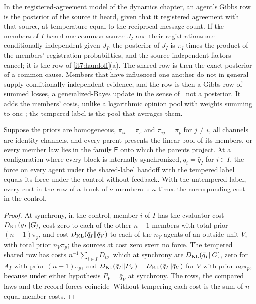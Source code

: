 \documentclass[11pt,letterpaper]{report}
\begin{document}
In the registered-agreement model of the dynamics chapter, an agent's Gibbs row is the posterior of the source it heard, given that it registered agreement with that source, at temperature equal to the reciprocal message count. If the members of $I$ heard one common source $J_I$ and their registrations are conditionally independent given $J_I$, the posterior of $J_I$ is $\pi_I$ times the product of the members' registration probabilities, and the source-independent factors cancel; it is the row of \cref{it7:handoff}(a). The shared row is then the exact posterior of a common cause. Members that have influenced one another do not in general supply conditionally independent evidence, and the row is then a Gibbs row of summed losses, a generalized-Bayes update in the sense of \citet{BissiriHolmesWalker2016}, not a posterior. It adds the members' costs, unlike a logarithmic opinion pool with weights summing to one \citep{GenestZidek1986}; the tempered label is the pool that averages them.

Suppose the priors are homogeneous, $\pi_{ii}=\pi_s$ and $\pi_{ij}=\pi_p$ for $j\ne i$, all channels are identity channels, and every parent presents the linear pool of its members, or every member law lies in the family $\mathsf E$ onto which the parents project. At a configuration where every block is internally synchronized, $q_i=\bar q_I$ for $i\in I$, the force on every agent under the shared-label handoff with the tempered label equals its force under the control without feedback. With the untempered label, every cost in the row of a block of $n$ members is $n$ times the corresponding cost in the control.
\begin{proof}
At synchrony, in the control, member $i$ of $I$ has the evaluator cost $D_{\mathrm{KL}}(\bar q_I\Vert G)$, cost zero to each of the other $n-1$ members with total prior $(n-1)\pi_p$, and cost $D_{\mathrm{KL}}(\bar q_I\Vert\bar q_V)$ to each of the $n_V$ agents of an outside unit $V$, with total prior $n_V\pi_p$; the sources at cost zero exert no force. The tempered shared row has costs $n^{-1}\sum_{i\in I}D_{i\nu}$, which at synchrony are $D_{\mathrm{KL}}(\bar q_I\Vert G)$, zero for $A_I$ with prior $(n-1)\pi_p$, and $D_{\mathrm{KL}}(\bar q_I\Vert P_V)=D_{\mathrm{KL}}(\bar q_I\Vert\bar q_V)$ for $V$ with prior $n_V\pi_p$, because under either hypothesis $P_V=\bar q_V$ at synchrony. The rows, the compared laws and the record forces coincide. Without tempering each cost is the sum of $n$ equal member costs.
\end{proof}
\end{document}
